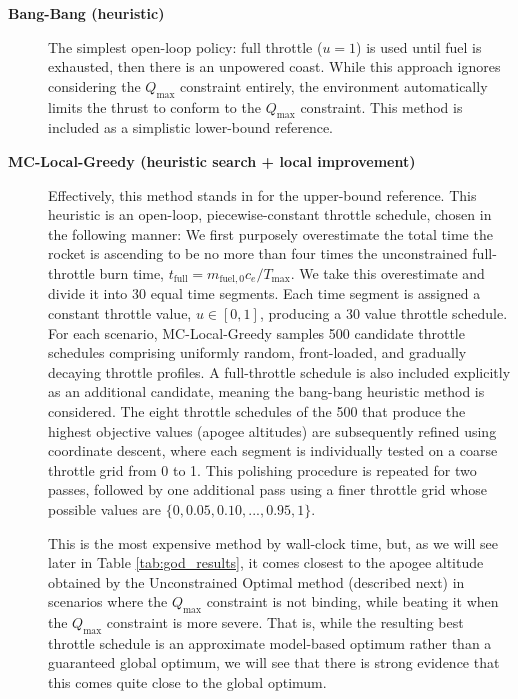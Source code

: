 \documentclass[mnsc,sglanonrev]{informs4}
\begin{document}
\begin{description}
  \item[\textbf{Bang-Bang (heuristic)}] The simplest open-loop policy: full throttle ($u=1$) is used until fuel is exhausted, then there is an unpowered coast. While this approach ignores considering the $Q_{\max}$ constraint entirely, the environment automatically limits the thrust to conform to the $Q_{\max}$ constraint. This method is included as a simplistic lower-bound reference.

  \item[\textbf{MC-Local-Greedy (heuristic search + local improvement)}] Effectively, this method stands in for the upper-bound reference. This heuristic is an open-loop, piecewise-constant throttle schedule, chosen in the following manner: We first purposely overestimate the total time the rocket is ascending to be no more than four times the unconstrained full-throttle burn time, $t_{\mathrm{full}}=m_{\mathrm{fuel},0}c_e/T_{\max}$. We take this overestimate and divide it into 30 equal time segments. Each time segment is assigned a constant throttle value, $u \in [0,1]$, producing a 30 value throttle schedule. For each scenario, MC-Local-Greedy samples 500 candidate throttle schedules comprising uniformly random, front-loaded, and gradually decaying throttle profiles. A full-throttle schedule is also included explicitly as an additional candidate, meaning the bang-bang heuristic method is considered.  The eight throttle schedules of the 500 that produce the highest objective values (apogee altitudes) are subsequently refined using coordinate descent, where each segment is individually tested on a coarse throttle grid from 0 to 1. This polishing procedure is repeated for two passes, followed by one additional pass using a finer throttle grid whose possible values are $\{0, 0.05, 0.10,...,0.95, 1\}$. 

  This is the most expensive method by wall-clock time, but, as we will see later in Table \ref{tab:god_results}, it comes closest to the apogee altitude obtained by the Unconstrained Optimal method (described next) in scenarios where the $Q_{\max}$ constraint is not binding, while beating it when the $Q_{\max}$ constraint is more severe. That is, while the resulting best throttle schedule is an approximate model-based optimum rather than a guaranteed global optimum, we will see that there is strong evidence that this comes quite close to the global optimum.


\end{description}
\end{document}
